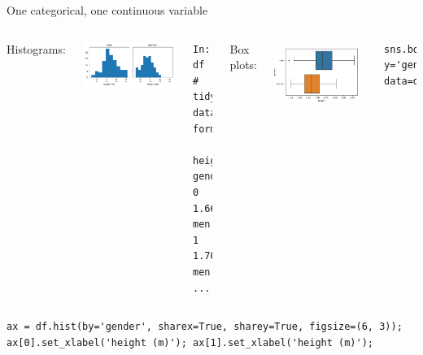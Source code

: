 \documentclass[aspectratio=169,usenames,dvipsnames]{beamer}
\begin{document}
\begin{frame}[fragile]{One categorical, one continuous variable}
    \begin{columns}[T]
            Histograms:

            \includegraphics[width=0.9\linewidth]{fig/contcontheighthist}

\begin{lstlisting}
In: df  # tidy data format!
    height  gender
0   1.66    men
1   1.70    men
...
\end{lstlisting}
            Box plots:

            \includegraphics[width=0.9\linewidth]{fig/contcontheightbox}

\begin{lstlisting}
sns.boxplot(x='height', y='gender', data=df)
\end{lstlisting}
    \end{columns}
\begin{lstlisting}
ax = df.hist(by='gender', sharex=True, sharey=True, figsize=(6, 3));
ax[0].set_xlabel('height (m)'); ax[1].set_xlabel('height (m)'); 
\end{lstlisting}
\end{frame}
\end{document}
